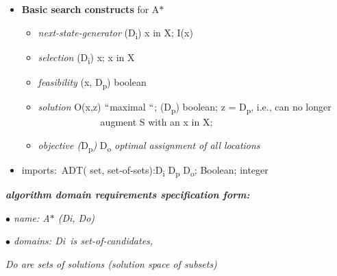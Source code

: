 \documentclass[journal]{IEEEtran}
\begin{document}
\begin{itemize}
	\item \textbf{Basic search constructs} for A$\ast$ \par

 \par

\begin{itemize}
	\item \textit{next-state-generator} (D\textsubscript{i}) \textrightarrow x in X; I(x) \par

	\item \textit{selection} (D\textsubscript{i}) \textrightarrow x; x in X \par

	\item \textit{feasibility} (x, D\textsubscript{p}) \textrightarrow boolean\par

	\item \textit{solution} O(x,z) $``$maximal $``$; (D\textsubscript{p}) \textrightarrow boolean; z = D\textsubscript{p}, i.e., can no longer \\
\ \ \ \ \ \ \ \ \ \ \ \ \  augment S with an x in X; \par

	\item \textit{objective (}D\textsubscript{p}\textit{) \textrightarrow }D\textsubscript{o }\textit{optimal assignment of all locations}
\end{itemize}\par

	\item imports:\  ADT( set, set-of-sets):D\textsubscript{i} D\textsubscript{p }D\textsubscript{o}; Boolean; integer
\end{itemize}\par

\vspace{\baselineskip}
\setlength{\parskip}{0.0pt}
\textbf{\textit{algorithm domain requirements speciﬁcation form:}}\par

\textit{$\bullet$  name:  A$\ast$   (Di,  Do)}\par

\textit{$\bullet$  domains:  Di\   is set-of-candidates,}\par

\textit{Do are sets of solutions (solution space of subsets)}\par
\end{document}
